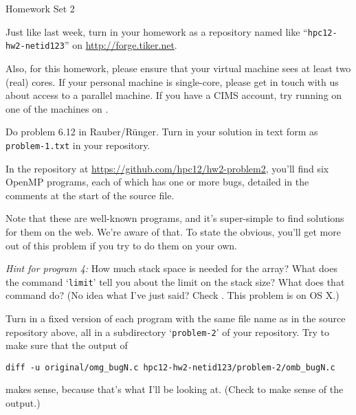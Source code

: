 \documentclass[11pt]{article}
\begin{document}
%
{Homework Set 2}

Just like last week, turn in your homework as a repository named like
``\texttt{hpc12-hw2-netid123}'' on \url{http://forge.tiker.net}.

Also, for this homework, please ensure that your virtual machine sees
at least two (real) cores. If your personal machine is single-core,
please get in touch with us about access to a parallel machine. If you
have a CIMS account, try running on one of the machines on
.

\bigskip
{}

Do problem 6.12 in Rauber/Rünger. Turn in your solution in text
form as \texttt{problem-1.txt} in your repository.

\bigskip


In the repository at \url{https://github.com/hpc12/hw2-problem2},
you'll find six OpenMP programs, each of which has one or more bugs,
detailed in the comments at the start of the source file.

Note that these are well-known programs, and it's super-simple to find
solutions for them on the web. We're aware of that. To state the
obvious, you'll get more out of this problem if you try to do them on
your own.

\emph{Hint for program 4:} How much stack space is needed for the
array? What does the command `\texttt{limit}' tell you about the
limit on the stack size? What does that command do? (No idea what I've just said?
Check .
This problem is
 on OS X.)

Turn in a fixed version of each program with the same file name as in
the source repository above, all in a subdirectory `\texttt{problem-2}'
of your repository. Try to make sure that the output of
\begin{lstlisting}
diff -u original/omg_bugN.c hpc12-hw2-netid123/problem-2/omb_bugN.c
\end{lstlisting}
makes sense, because that's what I'll be looking at.
(Check  to
make sense of the output.)
\end{document}
